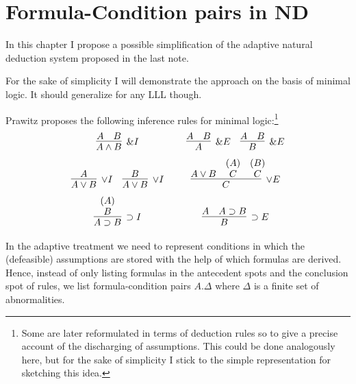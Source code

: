 \section{Formula-Condition pairs in ND}
In this chapter I propose a possible simplification of the
adaptive natural deduction system proposed in the last note.

For the sake of simplicity I will demonstrate the approach on
the basis of minimal logic. It should generalize for any LLL
though. 

Prawitz proposes the following inference rules for minimal
logic:\footnote{Some are later reformulated in terms of
  deduction rules so to give a precise account of the
  discharging of assumptions. This could be done analogously
  here, but for the sake of simplicity I stick to the simple
  representation for sketching this idea.}
\begin{equation*}
  \begin{array}[h]{c@{~~~~~~~}c}
    \infer[\& I]{A\wedge B}{A & B} & %
    \infer[\& E]{A}{A & B} ~~~\infer[\& E]{B}{A & B} \\[.2cm]
    \infer[\vee I]{A \vee B}{A} ~~~\infer[\vee I]{A \vee B}{B}
    & %
    \infer[\vee E]{C}{A\vee B & \deduce{C}{(A)} &
      \deduce{C}{(B)}} \\[.2cm]
    \infer[\supset I]{A \supset B}{\deduce{B}{(A)}} & %
    \infer[\supset E]{B}{A & A \supset B}   
  \end{array}
\end{equation*}

In the adaptive treatment we need to represent conditions in
which the (defeasible) assumptions are stored with the help
of which formulas are derived. Hence, instead of only listing
formulas in the antecedent spots and the conclusion spot of
rules, we list formula-condition pairs $A.\Delta$ where
$\Delta$ is a finite set of abnormalities.

